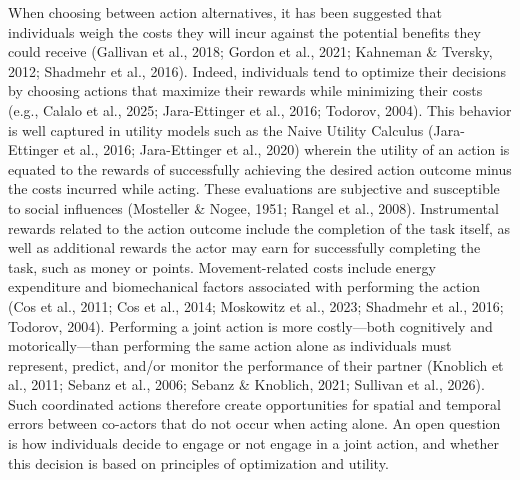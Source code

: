 \documentclass[
  11pt,
  letterpaper,
]{article}
\begin{document}
\addtocounter{page}{1}

When choosing between action alternatives, it has been suggested that
individuals weigh the costs they will incur against the potential
benefits they could receive (Gallivan et al., 2018; Gordon et al., 2021;
Kahneman \& Tversky, 2012; Shadmehr et al., 2016). Indeed, individuals
tend to optimize their decisions by choosing actions that maximize their
rewards while minimizing their costs (e.g., Calalo et al., 2025;
Jara-Ettinger et al., 2016; Todorov, 2004). This behavior is well
captured in utility models such as the Naive Utility Calculus
(Jara-Ettinger et al., 2016; Jara-Ettinger et al., 2020) wherein the
utility of an action is equated to the rewards of successfully achieving
the desired action outcome minus the costs incurred while acting. These
evaluations are subjective and susceptible to social influences
(Mosteller \& Nogee, 1951; Rangel et al., 2008). Instrumental rewards
related to the action outcome include the completion of the task itself,
as well as additional rewards the actor may earn for successfully
completing the task, such as money or points. Movement-related costs
include energy expenditure and biomechanical factors associated with
performing the action (Cos et al., 2011; Cos et al., 2014; Moskowitz et
al., 2023; Shadmehr et al., 2016; Todorov, 2004). Performing a joint
action is more costly---both cognitively and motorically---than
performing the same action alone as individuals must represent, predict,
and/or monitor the performance of their partner (Knoblich et al., 2011;
Sebanz et al., 2006; Sebanz \& Knoblich, 2021; Sullivan et al., 2026).
Such coordinated actions therefore create opportunities for spatial and
temporal errors between co-actors that do not occur when acting alone.
An open question is how individuals decide to engage or not engage in a
joint action, and whether this decision is based on principles of
optimization and utility.
\end{document}
